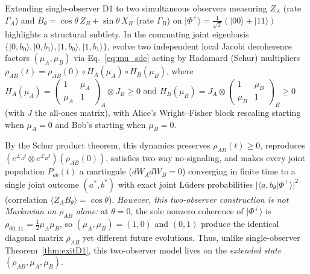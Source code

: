 \documentclass[aps,pra,10pt,twocolumn,superscriptaddress,amsmath,amssymb,floatfix]{revtex4-2}
\newcommand{\ket}[1]{|#1\rangle}
\newcommand{\braket}[2]{\langle #1|#2\rangle}
\begin{document}
Extending single-observer D1 to two simultaneous observers measuring $Z_A$ (rate $\Gamma_A$) and $B_\theta = \cos\theta\,Z_B + \sin\theta\,X_B$ (rate $\Gamma_B$) on $\ket{\Phi^+} = \frac{1}{\sqrt{2}}(\ket{00}+\ket{11})$ highlights a structural subtlety. In the commuting joint eigenbasis $\{\ket{0,b_0},\ket{0,b_1},\ket{1,b_0},\ket{1,b_1}\}$, evolve two independent local Jacobi decoherence factors $(\mu_A,\mu_B)$ via Eq.~\eqref{eq:mu_sde} acting by Hadamard (Schur) multipliers $\rho_{AB}(t) = \rho_{AB}(0) \circ H_A(\mu_A) \circ H_B(\mu_B)$, where $H_A(\mu_A) = \begin{pmatrix}1 & \mu_A\\ \mu_A & 1\end{pmatrix}_A \otimes J_B \ge 0$ and $H_B(\mu_B) = J_A \otimes \begin{pmatrix}1 & \mu_B\\ \mu_B & 1\end{pmatrix}_B \ge 0$ (with $J$ the all-ones matrix), with Alice's Wright--Fisher block rescaling starting when $\mu_A=0$ and Bob's starting when $\mu_B=0$.

By the Schur product theorem, this dynamics preserves $\rho_{AB}(t) \ge 0$, reproduces $(e^{\mathcal{L}_A t}\otimes e^{\mathcal{L}_B t})(\rho_{AB}(0))$, satisfies two-way no-signaling, and makes every joint population $P_{ab}(t)$ a martingale ($dW_A dW_B = 0$) converging in finite time to a single joint outcome $(a^*,b^*)$ with exact joint L\"uders probabilities $|\braket{a,b_\theta}{\Phi^+}|^2$ (correlation $\langle Z_A B_\theta\rangle = \cos\theta$). \emph{However, this two-observer construction is not Markovian on $\rho_{AB}$ alone:} at $\theta=0$, the sole nonzero coherence of $\ket{\Phi^+}$ is $\rho_{00,11} = \frac{1}{2}\mu_A\mu_B$, so $(\mu_A,\mu_B)=(1,0)$ and $(0,1)$ produce the identical diagonal matrix $\rho_{AB}$ yet different future evolutions. Thus, unlike single-observer Theorem~\ref{thm:exitD1}, this two-observer model lives on the \emph{extended state} $(\rho_{AB}, \mu_A, \mu_B)$.
\end{document}
